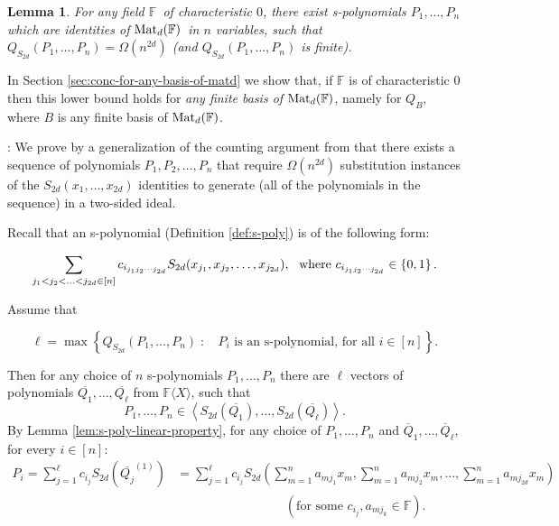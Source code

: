 \documentclass[12pt,reqno]{article}
\newtheorem{lemma}[theorem]{Lemma}
\newcommand\F{\ensuremath{\mathbb F}}
\renewcommand{\l}{\ell}
\newcommand{\matd}{{\ensuremath{{\rm Mat}_d(\F)}}}
\newcommand{\freea}{\ensuremath{\F\langle X\rangle}}
\newenvironment{proof}{\QuadSpace\par\noindent{\bf Proof}:}{\EndProof\HalfSpace}
\newcommand{\QuadSpace}{\vspace{0.25\baselineskip}}
\newcommand{\HalfSpace}{\vspace{0.5\baselineskip}}
\newcommand{\EndProof}{ \hfill \vrule width 1ex height 1ex depth 0pt }
\newcommand{\iddofix}[2][]
{\todo[inline, size=\footnotesize, caption={#2}, #1, linecolor=green!70!white,         backgroundcolor=red!30!white,bordercolor=white]
{{#2}}}
\newcommand{\set}[1]{\left\{#1\right\}}
\newcommand{\nx}[1]{#1_1,\ldots,#1_{n}}
\newcommand{\ideal}[1]{\ensuremath{\left\langle #1\right\rangle}}
\begin{document}
\begin{lemma}\label{lem:exist_for_nP}
For any field \F\ of characteristic $0$, there exist s-polynomials $\nx{P}$ which are identities of \matd\ in $n$ variables, such that $Q_{S_{2d}}(\nx{P})=\Omega (n^{2d})$ (and $Q_{S_{2d}}(\nx{P})$ is finite). \iddofix{***CHECK!***}
\end{lemma}

In Section \ref{sec:conc-for-any-basis-of-matd} we show that, if $\F$ is of characteristic $0$ then  this lower bound holds for \emph{any finite basis of} \matd, namely for $Q_B$, where $B$ is any finite basis of \matd.
\begin{proof}
We prove by a generalization of the counting argument from \cite{Hru11} that there exists a sequence of polynomials $P_1,P_2,\ldots,P_n$  that require  $\Omega \left(n^{2d}\right)$ substitution instances of the $S_{2d}(x_1,\ldots,x_{2d})$ identities to generate (all of the polynomials in the sequence) in a two-sided ideal.

Recall that an s-polynomial (Definition \ref{def:s-poly}) is of the following form:

\begin{equation}\label{eq:Pi-something}
\sum_{j_1<j_2<\ldots<j_{2d}\in [n]}c_{i_{j_1j_2\cdots j_{2d}}}S_{2d}(x_{j_1},x_{j_2},\ldots,x_{j_{2d}}),~\hbox{ where }c_{i_{j_1j_2\cdots j_{2d}}}\in \set{0,1}.
\end{equation}
\smallskip

Assume that

$$\l=\max \left\{Q_{S_{2d}}(\nx{P}) \;:\; \text{ $P_i$ is an s-polynomial, for all $i\in[n]$}\right\}.$$

 Then for any choice of $n$ s-polynomials $P_1,\ldots,P_n$ there are $\l$ vectors of polynomials $\overline{Q_1},\ldots,\overline{Q_{\l}}$ from \freea, such that
$$\nx{P}\in \ideal{S_{2d}(\overline{Q_1}),\ldots, S_{2d}(\overline{Q_{\l}})}.$$
By Lemma \ref{lem:s-poly-linear-property},
for any choice of $P_1,\ldots,P_n$ and $\overline Q_1,\ldots,\overline Q_\l$, for every $i\in[n]$:
\begin{align*}
P_i=\sum_{j=1}^{\l} c_{i_j}S_{2d}\left(\overline{Q_{j}}^{(1)}\right)&=\sum_{j=1}^{\l} c_{i_j}S_{2d}\left(\sum_{m=1}^n a_{mj_1}x_m,\sum_{m=1}^n a_{mj_2}x_m,\ldots,\sum_{m=1}^n a_{mj_{2d}}x_m\right)\\
&~~~~~~~~~~~~~~~~~~~~~~~~~~~~~~~~~~~~~~~(\text{for some } c_{i_j},a_{mj_{k}}\in \F).
\end{align*}


\end{proof}
\end{document}
